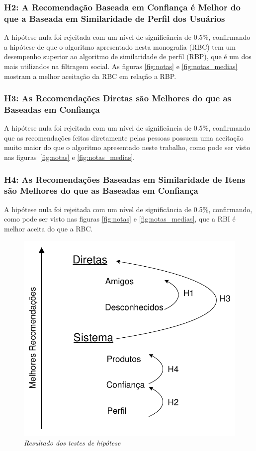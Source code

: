 \subsubsection{H2: A Recomendação Baseada em Confiança é Melhor do que a Baseada em Similaridade de Perfil dos Usuários}
A hipótese nula foi rejeitada com um nível de significância de 0.5\%, confirmando a hipótese de que o algoritmo apresentado nesta monografia (RBC) tem um desempenho superior ao algoritmo de similaridade de perfil (RBP), que é um dos mais utilizados na filtragem social. As figuras \ref{fig:notas} e \ref{fig:notas_medias} mostram a melhor aceitação da RBC em relação a RBP.

\subsubsection{H3: As Recomendações Diretas são Melhores do que as Baseadas em Confiança}
A hipótese nula foi rejeitada com um nível de significância de 0.5\%, confirmando que as recomendações feitas diretamente pelas pessoas possuem uma aceitação muito maior do que o algoritmo apresentado neste trabalho, como pode ser visto nas figuras~\ref{fig:notas} e \ref{fig:notas_medias}.

\subsubsection{H4: As Recomendações Baseadas em Similaridade de Itens são Melhores do que as Baseadas em Confiança}
A hipótese nula foi rejeitada com um nível de significância de 0.5\%, confirmando, como pode ser visto nas figuras \ref{fig:notas} e \ref{fig:notas_medias}, que a RBI é melhor aceita do que a RBC.

\begin{figure}
    \centering
    \includegraphics[width=\textwidth]{imagens/testes}
    \caption{\it Resultado dos testes de hipótese}
    \label{fig:testes}
\end{figure}

